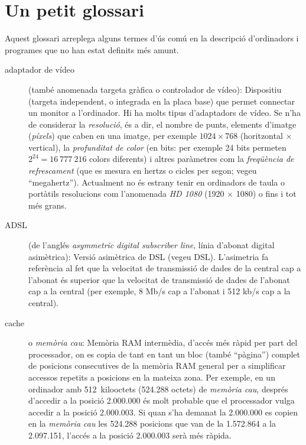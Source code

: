 \section{Un petit glossari}
\label{ss:OiPgloss}
Aquest glossari arreplega alguns termes d'ús comú en la descripció
d'ordinadors i programes que no han estat definits més amunt.

\begin{description}
\item[adaptador de vídeo] (també anomenada targeta gràfica o
  controlador de vídeo): Dispositiu (targeta independent, o integrada
  en la placa base) que permet connectar un monitor a l'ordinador. Hi
  ha molts tipus d'adaptadors de vídeo. Se n'ha de considerar la
  \emph{resolució}, és a dir, el nombre de punts, elements d'imatge
  (\emph{píxels}) que caben en una imatge, per exemple $1024 \times
  768$ (horitzontal $\times$ vertical), la \emph{profunditat de color}
  (en bits: per exemple 24 bits permeten $2^{24}=16~777~216$ colors
  diferents) i altres paràmetres com la {\em freqüència de
    refrescament} (que es mesura en hertzs o cicles per segon; vegeu
  ``megahertz''). Actualment no és estrany tenir en ordinadors de
  taula o portàtils resolucions com l'anomenada \emph{HD 1080} (1920
  $\times$ 1080) o fins i tot més grans.
  
\item[ADSL] (de l'anglés \emph{asymmetric digital subscriber line},
  línia d'abonat digital asimètrica): Versió asimètrica de DSL (vegeu
  DSL). L'asimetria fa referència al fet que la velocitat de
  transmissió de dades de la central cap a l'abonat és superior que la
  velocitat de transmissió de dades de l'abonat cap a la central (per
  exemple, 8 Mb/s cap a l'abonat i 512 kb/s cap a la central).

\item[cache] o \emph{memòria cau}: Memòria RAM intermèdia, d'accés més
  ràpid per part del processador, on es copia de tant en tant un bloc
  (també ``pàgina'') complet de posicions consecutives de la memòria
  RAM general per a simplificar accessos repetits a posicions en la
  mateixa zona. Per exemple, en un ordinador amb 512~kilooctets
  (524.288 octets) de \emph{memòria cau}, després d'accedir a la
  posició 2.000.000 és molt probable que el processador vulga accedir
  a la posició 2.000.003. Si quan s'ha demanat la 2.000.000 es copien
  en la \emph{memòria cau} les 524.288 posicions que van de la
  1.572.864 a la 2.097.151, l'accés a la posició 2.000.003 serà més
  ràpida.


\end{description}
